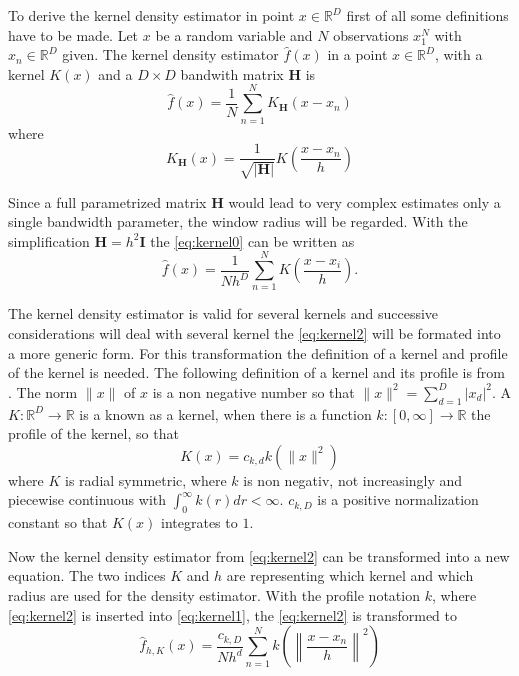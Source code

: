 To derive the kernel density estimator in point $x \in \mathbb{R}^D$
first of all some definitions have to be made. Let $x$ be a random
variable and $N$ observations $x_1^N$ with $x_n \in \mathbb{R}^D$
given. The kernel density estimator $\hat{f}(x)$ in a point $x \in
\mathbb{R}^D$, with a kernel $K(x)$ and a $D \times D$ bandwith matrix
$\mathbf{H}$ is
\begin{equation}\label{eq:kernel0}
  \hat{f}(x) = \frac{1}{N} \sum_{n = 1}^N K_{\mathbf{H}}\left( x-x_n \right)
\end{equation} 
where
\begin{equation}\label{eq:kernel1}
  K_{\mathbf{H}}(x) = \frac{1}{\sqrt{|\mathbf{H}|}}K \left( \frac{x - x_n}{h} \right)
\end{equation} 

Since a full parametrized matrix $\mathbf{H}$ would lead to very
complex estimates only a single bandwidth parameter, the window radius
will be regarded. With the simplification $\mathbf{H} = h^2
\mathbf{I}$ the \autoref{eq:kernel0} can be written as
\begin{equation}\label{eq:kernel2}
  \hat{f}(x) = \frac{1}{Nh^D}\sum_{n=1}^N K\left( \frac{x - x_i}{h} \right).
\end{equation}

The kernel density estimator is valid for several kernels and
successive considerations will deal with several kernel the
\autoref{eq:kernel2} will be formated into a more generic form. For
this transformation the definition of a kernel and profile of the
kernel is needed. The following definition of a kernel and its profile
is from \citeauthor{citeulike:2522867} \citep{citeulike:2522867}. The
norm $\lVert x \rVert$ of $x$ is a non negative number so that $\lVert
x \rVert^2 = \sum_{d = 1}^D|x_d|^2$.  A $K:\mathbb{R}^D \rightarrow
\mathbb{R}$ is a known as a kernel, when there is a function $k:[0,
\infty] \rightarrow \mathbb{R}$ the profile of the kernel, so that
\begin{equation}\label{eq:kernel3}
  K(x)=c_{k,d}k(\lVert x \rVert^2)
\end{equation}
where $K$ is radial symmetric, where $k$ is non negativ, not
increasingly and piecewise continuous with $\int_0^{\infty} k(r) dr <
\infty$. $c_{k,D}$ is a positive normalization constant so that $K(x)$
integrates to $1$.

Now the kernel density estimator from \autoref{eq:kernel2} can be
transformed into a new equation. The two indices $K$ and $h$ are
representing which kernel and which radius are used for the density
estimator. With the profile notation $k$, where \autoref{eq:kernel2}
is inserted into \autoref{eq:kernel1}, the \autoref{eq:kernel2} is
transformed to
\begin{equation}\label{eq:kernel4}
  \hat{f}_{h,K}(x) = \frac{c_{k,D}}{Nh^d}
  \sum_{n = 1}^N k\left(\left\lVert \frac{x-x_n}{h} \right\rVert^2\right)
\end{equation}



